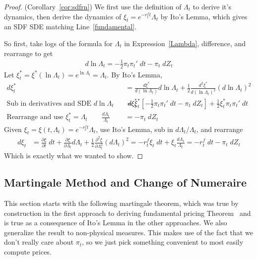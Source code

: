\documentclass[12pt]{article}
\theoremstyle{plain}
\theoremstyle{definition}
\theoremstyle{remark}
\begin{document}
\begin{proof}
(Corollary~\ref{cor:sdfrn})
We first use the definition of $\Lambda_t$ to derive it's
dynamics, then derive the dynamics of $\xi_t=e^{-r_t^ft}\Lambda_t$ by
Ito's Lemma, which gives an SDF SDE matching
Line~\ref{fundamental}.

So first, take logs of the formula for $\Lambda_t$ in
Expression~\ref{Lambda}, difference, and rearrange to get
\begin{align*}
  d\ln\Lambda_t
  =
  - \frac{1}{2}\pi_t\pi_t'\;dt
  - \pi_t\;dZ_t
\end{align*}
Let $\xi_t^*=\xi^*(\ln\Lambda_t)=e^{\ln \Lambda_t}=\Lambda_t$.
By Ito's Lemma,
\begin{align*}
  d\xi_t^*
  &=
  \frac{d\xi^*}{d(\ln\Lambda_t)}d\ln\Lambda_t
  +
  \frac{1}{2}
  \frac{d^2\xi^*}{d(\ln\Lambda_t)^2}(d\ln\Lambda_t)^2
  \\
  \text{Sub in derivatives and SDE $d\ln\Lambda_t$}
  \qquad
  d\xi_t^*
  &=
  \xi_t^*
  \left[
  - \frac{1}{2}
    \pi_t\pi_t'\;dt
  - \pi_t\;dZ_t
  \right]
  +
  \frac{1}{2}
  \xi_t^*
  \pi_t\pi_t'\;dt
  \\
  \text{Rearrange and use $\xi_t^*=\Lambda_t$}
  \qquad
  \frac{d\Lambda_t}{\Lambda_t}
  &=
  - \pi_t\;dZ_t
\end{align*}
Given $\xi_t=\xi(t,\Lambda_t)=e^{-r_t^ft}\Lambda_t$,
use Ito's Lemma, sub in $d\Lambda_t/\Lambda_t$, and rearrange
\begin{align*}
  d\xi_t
  &=
  \frac{\partial \xi}{\partial t}\;dt
  + \frac{\partial \xi}{\partial \Lambda_t}d\Lambda_t
  + \frac{1}{2}\frac{\partial^2 \xi}{\partial \Lambda_t^2}(d\Lambda_t)^2
  =
  -r_t^f \xi_t\;dt
  + \xi_t\frac{d\Lambda_t}{\Lambda_t}
  =
  -r_t^f \;dt
  - \pi_t\;dZ_t
\end{align*}
Which is exactly what we wanted to show.
\end{proof}


\clearpage
\subsection{Martingale Method and Change of Numeraire}

This section starts with the following martingale theorem,
which was true by construction in the first approach to deriving
fundamental pricing Theorem~ and is true as a
consequence of Ito's Lemma in the other approaches.
We also generalize the result to non-physical measures.
This makes use of the fact that we don't really care about $\pi_t$, so
we just pick something convenient to most easily compute prices.
\end{document}
